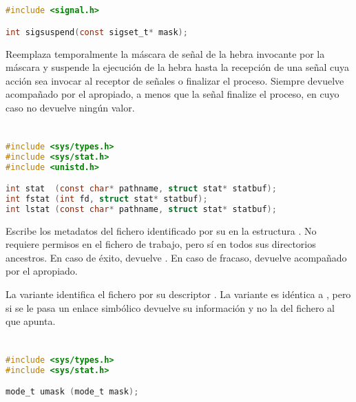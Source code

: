 \section{}\label{sigsuspend}

\begin{lstlisting}[language=C]
#include <signal.h>

int sigsuspend(const sigset_t* mask);
\end{lstlisting}

Reemplaza temporalmente la máscara de señal de la hebra invocante por la máscara  y suspende la ejecución de la hebra hasta la recepción de una señal cuya acción sea invocar al receptor de señales o finalizar el proceso.
Siempre devuelve  acompañado por el  apropiado, a menos que la señal finalize el proceso, en cuyo caso no devuelve ningún valor.

\section{}\label{stat}

\begin{lstlisting}[language=C]
#include <sys/types.h>
#include <sys/stat.h>
#include <unistd.h>

int stat  (const char* pathname, struct stat* statbuf);
int fstat (int fd, struct stat* statbuf);
int lstat (const char* pathname, struct stat* statbuf);
\end{lstlisting}

Escribe los metadatos del fichero identificado por su  en la estructura .
No requiere permisos en el fichero de trabajo, pero sí en todos sus directorios ancestros.
En caso de éxito, devuelve .
En caso de fracaso, devuelve  acompañado por el  apropiado.

La variante  identifica el fichero por su descriptor .
La variante  es idéntica a , pero si se le pasa un enlace simbólico devuelve su información y no la del fichero al que apunta.

\section{}\label{umask}

\begin{lstlisting}[language=C]
#include <sys/types.h>
#include <sys/stat.h>

mode_t umask (mode_t mask);
\end{lstlisting}

